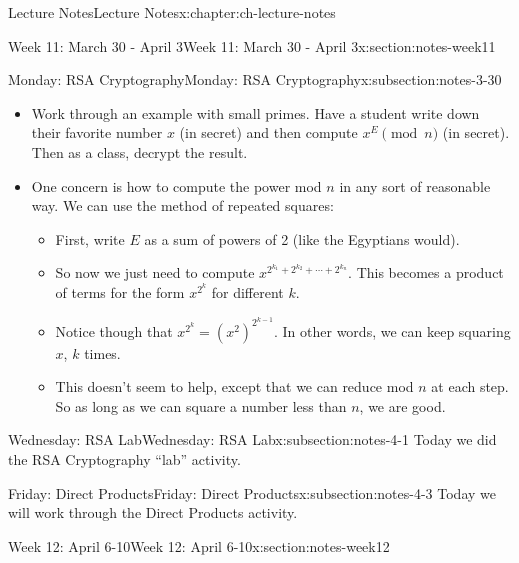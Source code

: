 \documentclass[oneside,11pt,]{book}
\begin{document}
\begin{chapterptx}{Lecture Notes}{}{Lecture Notes}{}{}{x:chapter:ch-lecture-notes}
\begin{sectionptx}{Week 11: March 30 - April 3}{}{Week 11: March 30 - April 3}{}{}{x:section:notes-week11}
\begin{subsectionptx}{Monday: RSA Cryptography}{}{Monday: RSA Cryptography}{}{}{x:subsection:notes-3-30}
\begin{itemize}[label=\textbullet]
\begin{itemize}[label=$\circ$]
\end{itemize}
%
\item{}Work through an example with small primes. Have a student write down their favorite number \(x\) (in secret) and then compute \(x^E \pmod n\) (in secret). Then as a class, decrypt the result.%
\item{}One concern is how to compute the power mod \(n\) in any sort of reasonable way. We can use the method of repeated squares:%
\par
%
\begin{itemize}[label=$\circ$]
\item{}First, write \(E\) as a sum of powers of 2 (like the Egyptians would).%
\item{}So now we just need to compute \(x^{2^{k_1}+2^{k_2}+ \cdots + 2^{k_n}}\). This becomes a product of terms for the form \(x^{2^k}\) for different \(k\).%
\item{}Notice though that \(x^{2^k} = (x^2)^{2^{k-1}}\). In other words, we can keep squaring \(x\),              \(k\) times.%
\item{}This doesn’t seem to help, except that we can reduce mod \(n\) at each step. So as long as we can square a number less than \(n\), we are good.%
\end{itemize}
%
\end{itemize}
%
\end{subsectionptx}
%
%
\typeout{************************************************}
\typeout{************************************************}
%
\begin{subsectionptx}{Wednesday: RSA Lab}{}{Wednesday: RSA Lab}{}{}{x:subsection:notes-4-1}
Today we did the RSA Cryptography ``lab'' activity.%
\end{subsectionptx}
%
%
\typeout{************************************************}
\typeout{************************************************}
%
\begin{subsectionptx}{Friday: Direct Products}{}{Friday: Direct Products}{}{}{x:subsection:notes-4-3}
Today we will work through the Direct Products activity.%
\end{subsectionptx}
\end{sectionptx}
%
%
\typeout{************************************************}
\typeout{************************************************}
%
\begin{sectionptx}{Week 12: April 6-10}{}{Week 12: April 6-10}{}{}{x:section:notes-week12}

\end{sectionptx}
\end{chapterptx}
\end{document}
